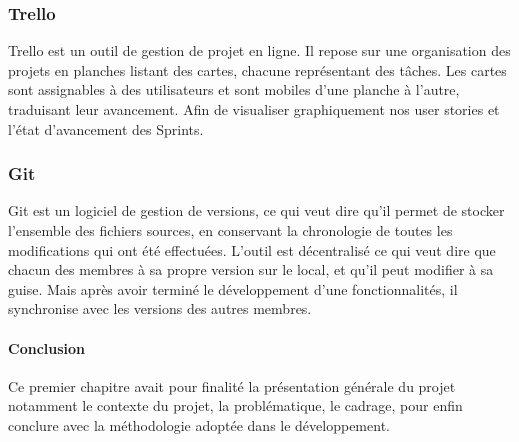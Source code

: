 \subsubsection{Trello} %
\label{ssub:subsubsection_name}

Trello est un outil de gestion de projet en ligne. Il repose sur une organisation des projets en planches listant des cartes, chacune représentant des tâches. Les cartes sont assignables à des utilisateurs et sont mobiles d'une planche à l'autre, traduisant leur avancement. Afin de visualiser graphiquement nos user stories et l’état d'avancement des Sprints.


\subsubsection{Git} %
\label{ssub:git}

Git est un logiciel de gestion de versions, ce qui veut dire qu'il permet de stocker l’ensemble des fichiers sources, en conservant la chronologie de toutes les modifications qui ont été effectuées.\newline
L'outil est décentralisé ce qui veut dire que chacun des membres à sa propre version sur le local, et qu'il peut modifier à sa guise. Mais après avoir terminé le développement d'une fonctionnalités, il synchronise avec les versions des autres membres.
\paragraph{Conclusion} %
\label{par:conclusion}
Ce premier chapitre avait pour finalité la présentation générale du projet notamment le contexte du projet, la problématique, le cadrage, pour enfin conclure avec la méthodologie adoptée dans le développement.

